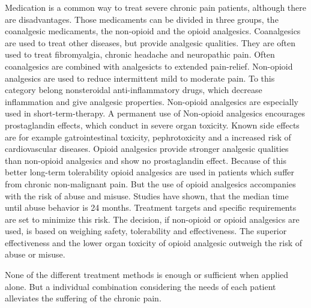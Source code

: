 Medication is a common way to treat severe chronic pain patients, although there are disadvantages. Those medicaments can be divided in three groups, the coanalgesic medicaments, the non-opioid and the opioid analgesics. 
Coanalgesics are used to treat other diseases, but provide analgesic qualities. They are often used to treat fibromyalgia, chronic headache and neuropathic pain. Often coanalgesics are combined with analgesicts to extended pain-relief.
Non-opioid analgesics are used to reduce intermittent mild to moderate pain. To this category belong nonsteroidal anti-inflammatory drugs, which decrease inflammation and give analgesic properties. Non-opioid analgesics are especially used in short-term-therapy. A permanent use of Non-opioid analgesics encourages prostaglandin effects, which conduct in severe organ toxicity. Known side effects are for example gatrointestinal toxicity, pephrotoxicity and a increased risk of cardiovascular diseases.
Opioid analgesics provide stronger analgesic qualities than non-opioid analgesics and show no prostaglandin effect. Because of this better long-term tolerability opioid analgesics are used in patients which suffer from chronic non-malignant pain. But the use of opioid analgesics accompanies with the risk of abuse and misuse. Studies have shown, that the median time until abuse behavior is 24 months. Treatment targets and specific requirements are set to minimize this risk.
The decision, if non-opioid or opioid analgesics are used, is based on weighing safety, tolerability and effectiveness. The superior effectiveness and the lower organ toxicity of opioid analgesic outweigh the risk of abuse or misuse.

None of the different treatment methods is enough or sufficient when applied alone. But a individual combination considering the needs of each patient alleviates the suffering of the chronic pain.